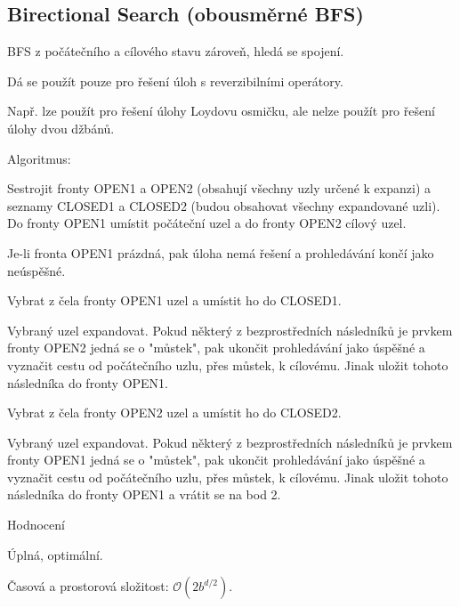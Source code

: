 \subsection{Birectional Search (obousměrné BFS)}

\begin{compactitem}
    \item BFS z počátečního a cílového stavu zároveň, hledá se spojení.
    \item Dá se použít pouze pro řešení úloh s reverzibilními operátory.
    \begin{compactitem}
        \item Např. lze použít pro řešení úlohy Loydovu osmičku, ale nelze použít pro řešení úlohy dvou džbánů.
    \end{compactitem}

    \item Algoritmus: \begin{compactenum}
        \item Sestrojit fronty OPEN1 a OPEN2 (obsahují všechny uzly určené k expanzi) a seznamy CLOSED1 a CLOSED2 (budou obsahovat všechny expandované uzli). Do fronty OPEN1 umístit počáteční uzel a do fronty OPEN2 cílový uzel.
        \item Je-li fronta OPEN1 prázdná, pak úloha nemá řešení a prohledávání končí jako neúspěšné.
        \item Vybrat z čela fronty OPEN1 uzel a umístit ho do CLOSED1.
        \item Vybraný uzel expandovat. Pokud některý z bezprostředních následníků je prvkem fronty OPEN2 jedná se o "můstek", pak ukončit prohledávání jako úspěšné a vyznačit cestu od počátečního uzlu, přes můstek, k cílovému. Jinak uložit tohoto následníka do fronty OPEN1.
        \item Vybrat z čela fronty OPEN2 uzel a umístit ho do CLOSED2.
        \item Vybraný uzel expandovat. Pokud některý z bezprostředních následníků je prvkem fronty OPEN1 jedná se o "můstek", pak ukončit prohledávání jako úspěšné a vyznačit cestu od počátečního uzlu, přes můstek, k cílovému. Jinak uložit tohoto následníka do fronty OPEN1 a vrátit se na bod 2.
    \end{compactenum}

    \item Hodnocení \begin{compactitem}
        \item Úplná, optimální.
        \item Časová a prostorová složitost: $\mathcal{O}(2b^{d / 2})$.
    \end{compactitem}
\end{compactitem}

